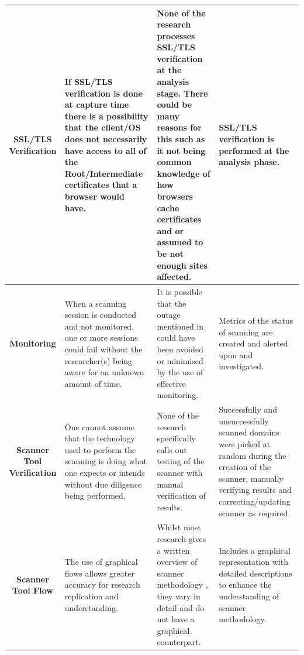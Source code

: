 \documentclass{mscreport}
\begin{document}
\begin{center}
\begin{longtable}{|C|E|H|H|}
      \hline
      \textbf{SSL/TLS Verification} & If SSL/TLS verification is done at capture time there is a possibility that the client/OS does not necessarily have access to all of the Root/Intermediate certificates that a browser would have. & None of the research \cite{Patil2017-bg,Buchanan2018-xz,Amann2017-co,Kotzias2018-wd,Poteat2021-zr,Roth2020-hg,Van_Goethem2014-ao,Chen2016-dl,Kumar2017-qw,Calzavara2018-xv,Holz2020-ha,Michael2015-hn,} processes SSL/TLS verification at the analysis stage. There could be many reasons for this such as it not being common knowledge of how browsers cache certificates and or assumed to be not enough sites affected. & SSL/TLS verification is performed at the analysis phase. \\
      \hline
      \textbf{Monitoring} & When a scanning session is conducted and not monitored, one or more sessions could fail without the researcher(s) being aware for an unknown amount of time. & It is possible that the outage mentioned in \cite{Poteat2021-zr} could have been avoided or minimised by the use of effective monitoring. & Metrics of the status of scanning are created and alerted upon and investigated. \\
      \hline
      \textbf{Scanner Tool Verification} & One cannot assume that the technology used to perform the scanning is doing what one expects or intends without due diligence being performed. & None of the research specifically calls out testing of the scanner with manual verification of results. & Successfully and unsuccessfully scanned domains were picked at random during the creation of the scanner, manually verifying results and correcting/updating scanner as required. \\
      \hline
      \textbf{Scanner Tool Flow} & The use of graphical flows allows greater accuracy for research replication and understanding. & Whilst most research gives a written overview of scanner methodology \cite{Buchanan2018-xz,Amann2017-co,Patil2017-bg,Kotzias2018-wd,Poteat2021-zr,Van_Goethem2014-ao,Chen2016-dl,Kumar2017-qw,Holz2020-ha,Michael2015-hn}, they vary in detail and do not have a graphical counterpart. & Includes a graphical representation with detailed descriptions to enhance the understanding of scanner methodology. \\
\end{longtable}
\end{center}
\end{document}
